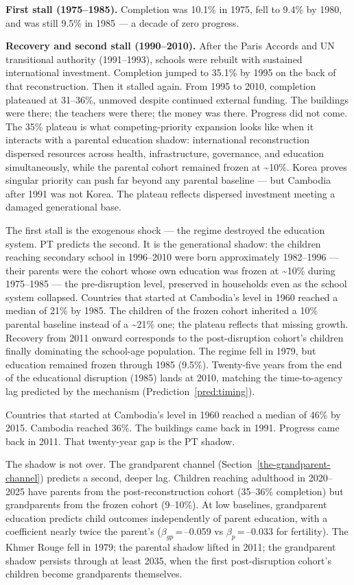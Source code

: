 \documentclass[12pt,letterpaper]{article}
\begin{document}
\textbf{First stall (1975--1985).} Completion was 10.1\% in 1975, fell to 9.4\% by 1980, and was still 9.5\% in 1985 --- a decade of zero progress.

\textbf{Recovery and second stall (1990--2010).} After the Paris Accords
and UN transitional authority (1991--1993), schools were rebuilt with
sustained international investment. Completion jumped to 35.1\% by 1995
on the back of that reconstruction. Then it stalled again. From 1995 to
2010, completion plateaued at 31--36\%, unmoved despite continued
external funding. The buildings were there; the teachers were there; the
money was there. Progress did not come. The 35\% plateau is what
competing-priority expansion looks like when it interacts with a
parental education shadow: international reconstruction dispersed
resources across health, infrastructure, governance, and education
simultaneously, while the parental cohort remained frozen at
\textasciitilde10\%. Korea proves singular priority can push far beyond
any parental baseline --- but Cambodia after 1991 was not Korea. The
plateau reflects dispersed investment meeting a damaged generational
base.

The first stall is the exogenous shock --- the regime destroyed the
education system. PT predicts the second. It is the generational shadow:
the children reaching secondary school in 1996--2010 were born
approximately 1982--1996 --- their parents were the cohort whose own
education was frozen at \textasciitilde10\% during 1975--1985 --- the
pre-disruption level, preserved in households even as the school system
collapsed. Countries that started at Cambodia's level in 1960 reached a
median of 21\% by 1985. The children of the frozen cohort inherited a
10\% parental baseline instead of a \textasciitilde21\% one; the plateau
reflects that missing growth. Recovery
from 2011 onward corresponds to the post-disruption cohort's children
finally dominating the school-age population. The regime fell in 1979,
but education remained frozen through 1985 (9.5\%). Twenty-five years
from the end of the educational disruption (1985) lands at 2010, matching the time-to-agency lag predicted by the mechanism (Prediction~\ref{pred:timing}).

Countries that started at Cambodia's level in 1960 reached a median of
46\% by 2015. Cambodia reached 36\%. The buildings came back in 1991.
Progress came back in 2011. That twenty-year gap is the PT shadow.

The shadow is not over. The grandparent channel
(Section~\ref{the-grandparent-channel}) predicts a second, deeper lag.
Children reaching adulthood in 2020--2025 have parents from the
post-reconstruction cohort (35--36\% completion) but grandparents from
the frozen cohort (9--10\%). At low baselines, grandparent education
predicts child outcomes independently of parent education, with a
coefficient nearly twice the parent's
($\beta_{gp}$\,=\,--0.059 vs $\beta_p$\,=\,--0.033 for fertility).
The Khmer Rouge fell in 1979; the parental shadow lifted in 2011;
the grandparent shadow persists through at least 2035, when the first
post-disruption cohort's children become grandparents themselves.
\end{document}
